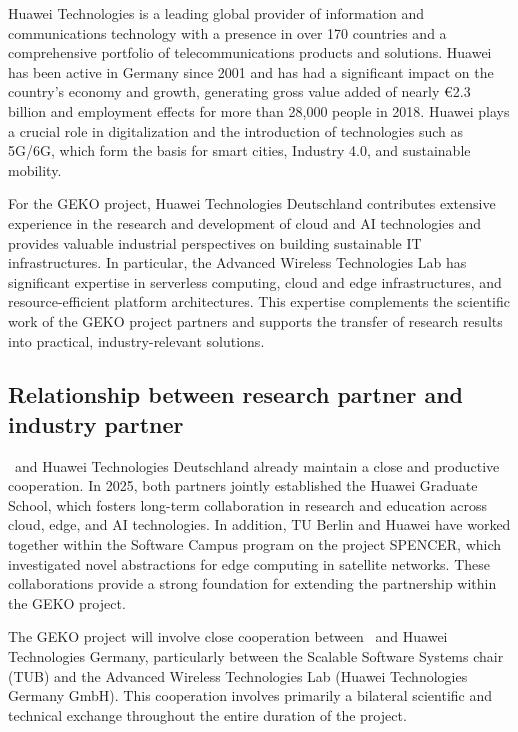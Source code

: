 Huawei Technologies is a leading global provider of information and communications technology with a presence in over 170 countries and a comprehensive portfolio of telecommunications products and solutions.
Huawei has been active in Germany since 2001 and has had a significant impact on the country's economy and growth, generating gross value added of nearly €2.3 billion and employment effects for more than 28,000 people in 2018.
Huawei plays a crucial role in digitalization and the introduction of technologies such as 5G/6G, which form the basis for smart cities, Industry 4.0, and sustainable mobility.

For the GEKO project, Huawei Technologies Deutschland contributes extensive experience in the research and development of cloud and AI technologies and provides valuable industrial perspectives on building sustainable IT infrastructures.
In particular, the Advanced Wireless Technologies Lab has significant expertise in serverless computing, cloud and edge infrastructures, and resource-efficient platform architectures.
This expertise complements the scientific work of the GEKO project partners and supports the transfer of research results into practical, industry-relevant solutions.


\subsection{Relationship between research partner and industry partner}
\label{sec:partner:beziehung}


\TU\ and Huawei Technologies Deutschland already maintain a close and productive cooperation.
In 2025, both partners jointly established the Huawei Graduate School, which fosters long-term collaboration in research and education across cloud, edge, and AI technologies.
In addition, TU Berlin and Huawei have worked together within the Software Campus program on the project SPENCER, which investigated novel abstractions for edge computing in satellite networks.
These collaborations provide a strong foundation for extending the partnership within the GEKO project.

The GEKO project will involve close cooperation between \TU\ and Huawei Technologies Germany, particularly between the Scalable Software Systems chair (TUB) and the Advanced Wireless Technologies Lab (Huawei Technologies Germany GmbH).
This cooperation involves primarily a bilateral scientific and technical exchange throughout the entire duration of the project.

